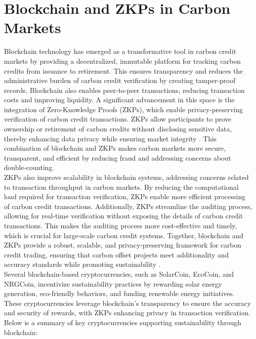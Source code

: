 \documentclass[preprint,12pt]{elsarticle}
\begin{document}
\section{Blockchain and ZKPs in Carbon Markets}
Blockchain technology has emerged as a transformative tool in carbon credit markets by providing a decentralized, immutable platform for tracking carbon credits from issuance to retirement. This ensures transparency and reduces the administrative burden of carbon credit verification by creating tamper-proof records. Blockchain also enables peer-to-peer transactions, reducing transaction costs and improving liquidity. A significant advancement in this space is the integration of Zero-Knowledge Proofs (ZKPs), which enable privacy-preserving verification of carbon credit transactions. ZKPs allow participants to prove ownership or retirement of carbon credits without disclosing sensitive data, thereby enhancing data privacy while ensuring market integrity \citep{Lin2022hybrid}. This combination of blockchain and ZKPs makes carbon markets more secure, transparent, and efficient by reducing fraud and addressing concerns about double-counting.\\
ZKPs also improve scalability in blockchain systems, addressing concerns related to transaction throughput in carbon markets. By reducing the computational load required for transaction verification, ZKPs enable more efficient processing of carbon credit transactions. Additionally, ZKPs streamline the auditing process, allowing for real-time verification without exposing the details of carbon credit transactions. This makes the auditing process more cost-effective and timely, which is crucial for large-scale carbon credit systems. Together, blockchain and ZKPs provide a robust, scalable, and privacy-preserving framework for carbon credit trading, ensuring that carbon offset projects meet additionality and accuracy standards while promoting sustainability \citep{kumar2020enhancing}.\\
Several blockchain-based cryptocurrencies, such as SolarCoin, EcoCoin, and NRGCoin, incentivize sustainability practices by rewarding solar energy generation, eco-friendly behaviors, and funding renewable energy initiatives. These cryptocurrencies leverage blockchain’s transparency to ensure the accuracy and security of rewards, with ZKPs enhancing privacy in transaction verification. Below is a summary of key cryptocurrencies supporting sustainability through blockchain:
\end{document}
